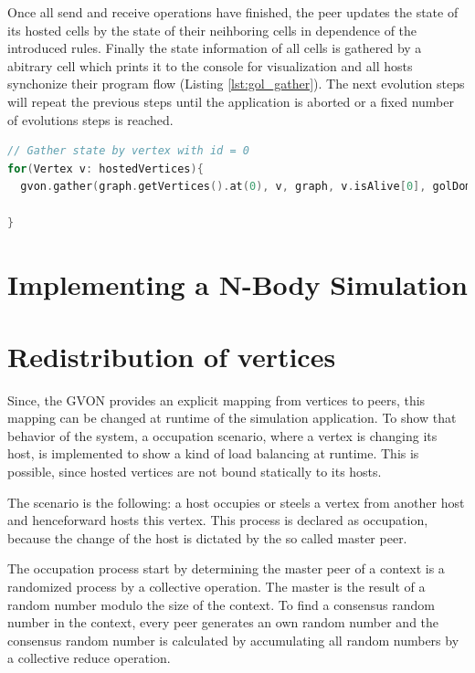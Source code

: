 Once all send and receive operations have finished, the peer updates
the state of its hosted cells by the state of their neihboring cells
in dependence of the introduced rules. Finally the state information
of all cells is gathered by a abitrary cell which prints it to the
console for visualization and all hosts synchonize their program flow
(Listing \ref{lst:gol_gather}). The next evolution steps will repeat the
previous steps until the application is aborted or a fixed number of
evolutions steps is reached.

\begin{lstlisting}[language=C++, label=lst:gol_gather, caption={\ } ]
// Gather state by vertex with id = 0
for(Vertex v: hostedVertices){
  gvon.gather(graph.getVertices().at(0), v, graph, v.isAlive[0], golDomain);

}
\end{lstlisting}

\section{Implementing a N-Body Simulation}

\section{Redistribution of vertices}

Since, the GVON provides an explicit mapping from vertices to peers,
this mapping can be changed at runtime of the simulation application.
To show that behavior of the system, a occupation scenario, where a
vertex is changing its host, is implemented to show a kind of load
balancing at runtime. This is possible, since hosted vertices are not
bound statically to its hosts.

The scenario is the following: a host occupies or steels a vertex
from another host and henceforward hosts this vertex.  This process
is declared as occupation, because the change of the host is
dictated by the so called master peer.

The occupation process start by determining the master peer of a
context is a randomized process by a collective operation. The
master is the result of a random number modulo the size of the
context. To find a consensus random number in the context, every
peer generates an own random number and the consensus random number
is calculated by accumulating all random numbers by a collective
reduce operation.

